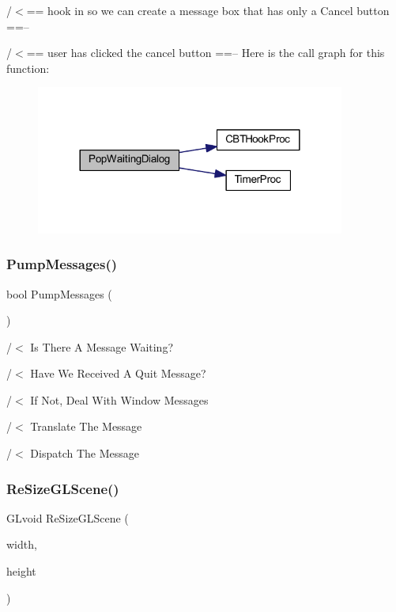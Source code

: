 /$<$== hook in so we can create a message box that has only a \textquotesingle{}Cancel\textquotesingle{} button ==--

/$<$== user has clicked the cancel button ==-- Here is the call graph for this function\+:\nopagebreak
\begin{figure}[H]
\begin{center}
\leavevmode
\includegraphics[width=288pt]{supportcode_8cpp_a23a9dac9e61c325f69b12b1b92b7d1f9_cgraph}
\end{center}
\end{figure}
\mbox{\label{supportcode_8cpp_aeeb837f0142eef8fa30508b562b8789b}} 
\subsubsection{Pump\+Messages()}
{\footnotesize\ttfamily bool Pump\+Messages (\begin{DoxyParamCaption}{ }\end{DoxyParamCaption})}

/$<$ Is There A Message Waiting?

/$<$ Have We Received A Quit Message?

/$<$ If Not, Deal With Window Messages

/$<$ Translate The Message

/$<$ Dispatch The Message \mbox{\label{supportcode_8cpp_a87bb84d489df61ed7b0c002584fd984f}} 
\subsubsection{Re\+Size\+G\+L\+Scene()}
{\footnotesize\ttfamily G\+Lvoid Re\+Size\+G\+L\+Scene (\begin{DoxyParamCaption}\item[{G\+Lsizei}]{width,  }\item[{G\+Lsizei}]{height }\end{DoxyParamCaption})}



